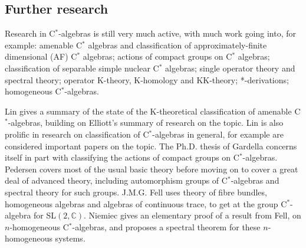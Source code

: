 \documentclass[12pt,a4paper]{amsart}
\theoremstyle{plain}
\theoremstyle{definition}
\begin{document}
\subsection{Further research}
	Research in C$^\ast$-algebras is still very much active, with much work going into, for example: 
	amenable C$^\ast$ algebras and classification of approximately-finite dimensional (AF) C$^\ast$ algebras; 
	actions of compact groups on C$^\ast$ algebras; 
	classification of separable simple nuclear C$^\ast$ algebras; 
	single operator theory and spectral theory; 
	operator K-theory, K-homology and KK-theory; 
	*-derivations;
	homogeneous C$^\ast$-algebras.
	
	
	Lin \cite{lin01} gives a summary of the state of the K-theoretical classification of amenable C$^\ast$-algebras, building on Elliott's summary \cite{elliott94} of research on the topic. 
	Lin is also prolific in research on classification of C$^\ast$-algebras in general, for example \cite{lin08,lin11} are considered important papers on the topic.
	The Ph.D. thesis \cite{gardella15} of Gardella concerns itself in part with classifying the actions of compact groups on C$^\ast$-algebras.
	Pedersen \cite{pedersen79} covers most of the usual basic theory before moving on to cover a great deal of advanced theory, including automorphism groups of C$^\ast$-algebras and spectral theory for such groups.
	J.M.G. Fell \cite{fell61} uses theory of fibre bundles, homogeneous algebras and algebras of continuous trace, to get at the group C$^\ast$-algebra for SL$(2,\mathbb{C})$.
	Niemiec \cite{niemiec12} gives an elementary proof of a result \cite[Theorem 3.2]{fell61} from Fell, on $n$-homogeneous C$^\ast$-algebras, and proposes a spectral theorem for these $n$-homogeneous systems.
	
	
\end{document}

